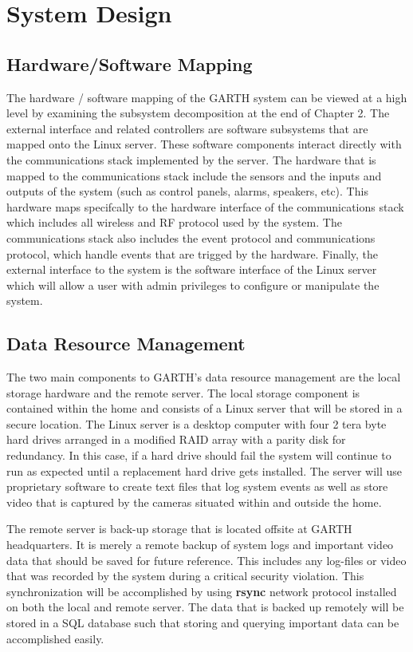 \documentclass{report}
\begin{document}
\chapter{System Design} %
\label{ch:system-design}

\section{Hardware/Software Mapping}

The hardware / software mapping of the GARTH system can be viewed at a high
level by examining the subsystem decomposition at the end of Chapter 2. The
external interface and related controllers are software subsystems that are
mapped onto the Linux server. These software components interact directly with
the communications stack implemented by the server. The hardware that is mapped
to the communications stack include the sensors and the inputs and outputs of 
the system (such as control panels, alarms, speakers, etc). This hardware maps 
specifcally to the hardware interface of the communications stack which includes
all wireless and RF protocol used by the system. The communications stack also
includes the event protocol and communications protocol, which handle events
that are trigged by the hardware. Finally, the external interface to the system
is the software interface of the Linux server which will allow a user with admin
privileges to configure or manipulate the system.

\section{Data Resource Management}

The two main components to GARTH's data resource management are the local
storage hardware and the remote server. The local storage component is
contained within the home and consists of a Linux server that will be stored in
a secure location. The Linux server is a desktop computer with four 2 tera byte
hard drives arranged in a modified RAID array with a parity disk for
redundancy. In this case, if a hard drive should fail the system will continue
to run as expected until a replacement hard drive gets installed. The server
will use proprietary software  to create text files that log system events as
well as store video that is captured by the cameras situated within and outside
the home.

The remote server is back-up storage that is located offsite at GARTH
headquarters. It is merely a remote backup of system logs and important video
data that should be saved for future reference. This includes any log-files or
video that was recorded by the system during a critical security violation. This
synchronization will be accomplished by using \textbf{rsync} network protocol
installed on both the local and remote server. The data that is backed up
remotely will be stored in a SQL database such that storing and querying
important data can be accomplished easily.
\end{document}
